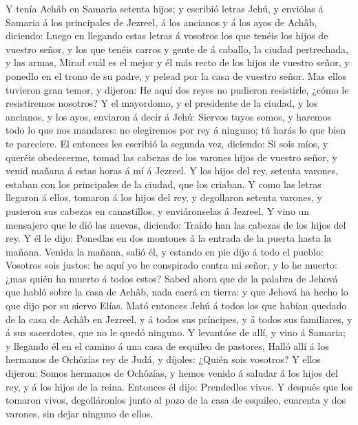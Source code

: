  Y tenía Achâb en Samaria setenta hijos; y escribió letras
Jehú, y enviólas á Samaria á los principales de Jezreel, á los ancianos
y á los ayos de Achâb, diciendo:  Luego en llegando estas
letras á vosotros los que tenéis los hijos de vuestro señor, y los que
tenéis carros y gente de á caballo, la ciudad pertrechada, y las armas,
 Mirad cuál es el mejor y él más recto de los hijos de
vuestro señor, y ponedlo en el trono de su padre, y pelead por la casa
de vuestro señor.  Mas ellos tuvieron gran temor, y
dijeron: He aquí dos reyes no pudieron resistirle, ¿cómo le resistiremos
nosotros?  Y el mayordomo, y el presidente de la ciudad, y
los ancianos, y los ayos, enviaron á decir á Jehú: Siervos tuyos somos,
y haremos todo lo que nos mandares: no elegiremos por rey á ninguno; tú
harás lo que bien te pareciere.  El entonces les escribió
la segunda vez, diciendo: Si sois míos, y queréis obedecerme, tomad las
cabezas de los varones hijos de vuestro señor, y venid mañana á estas
horas á mí á Jezreel. Y los hijos del rey, setenta varones, estaban con
los principales de la ciudad, que los criaban.  Y como las
letras llegaron á ellos, tomaron á los hijos del rey, y degollaron
setenta varones, y pusieron sus cabezas en canastillos, y enviáronselas
á Jezreel.  Y vino un mensajero que le dió las nuevas,
diciendo: Traído han las cabezas de los hijos del rey. Y él le dijo:
Ponedlas en dos montones á la entrada de la puerta hasta la mañana.
 Venida la mañana, salió él, y estando en pie dijo á todo
el pueblo: Vosotros sois justos: he aquí yo he conspirado contra mi
señor, y lo he muerto: ¿mas quién ha muerto á todos estos?
 Sabed ahora que de la palabra de Jehová que habló sobre
la casa de Achâb, nada caerá en tierra: y que Jehová ha hecho lo que
dijo por su siervo Elías.  Mató entonces Jehú á todos los
que habían quedado de la casa de Achâb en Jezreel, y á todos sus
príncipes, y á todos sus familiares, y á sus sacerdotes, que no le quedó
ninguno.  Y levantóse de allí, y vino á Samaria; y
llegando él en el camino á una casa de esquileo de pastores,
 Halló allí á los hermanos de Ochôzías rey de Judá, y
díjoles: ¿Quién sois vosotros? Y ellos dijeron: Somos hermanos de
Ochôzías, y hemos venido á saludar á los hijos del rey, y á los hijos de
la reina.  Entonces él dijo: Prendedlos vivos. Y después
que los tomaron vivos, degolláronlos junto al pozo de la casa de
esquileo, cuarenta y dos varones, sin dejar ninguno de ellos.
